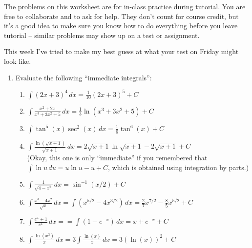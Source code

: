 \documentclass[12pt]{article}
\newcommand{\di}{\displaystyle}
\begin{document}
\thispagestyle{fancy}
The problems on this worksheet are for in-class practice during tutorial. You are free to collaborate and to ask for help. They don't count for course credit, but it's a good idea to make sure you know how to do everything before you leave tutorial -- similar problems may show up on a test or assignment.

\bigskip

This week I've tried to make my best guess at what your test on Friday might look like.

\begin{enumerate}
 \item Evaluate the following ``immediate integrals'':

\begin{enumerate}
 \item $\di \int (2x+3)^4\,dx = \frac{1}{10}(2x+3)^5+C$

\bigskip

 \item $\di \int \frac{x^2+2x}{x^3+3x^2+5}\,dx = \frac{1}{3}\ln(x^3+3x^2+5)+C$

\bigskip

 \item $\di \int \tan^5(x)\sec^2(x)\,dx = \frac{1}{6}\tan^6(x)+C$

\bigskip

 \item $\di \int \frac{\ln(\sqrt{x+1})}{\sqrt{x+1}}\,dx = 2\sqrt{x+1}\ln\sqrt{x+1}-2\sqrt{x+1}+C$\\
(Okay, this one is only ``immediate'' if you remembered that $\int \ln u\,du = u\ln u-u+C$, which is obtained using integration by parts.)

\bigskip

 \item $\di \int \frac{1}{\sqrt{4-x^2}}\,dx = \sin^{-1}(x/2)+C$

\bigskip

 \item $\di \int \frac{x^3-4x^2}{\sqrt{x}}\,dx = \int(x^{5/2}-4x^{3/2})\,dx = \frac{2}{7}x^{7/2}-\frac{8}{5}x^{5/2}+C$

\bigskip

 \item $\di \int \frac{e^x+1}{e^x}\,dx = =\int (1-e^{-x})\,dx = x+e^{-x}+C$

\bigskip

 \item $\di \int \frac{\ln(x^3)}{x}\,dx = 3\int \frac{\ln(x)}{x}\,dx = 3(\ln(x))^2+C$ 


\end{enumerate}
\end{enumerate}
\end{document}
